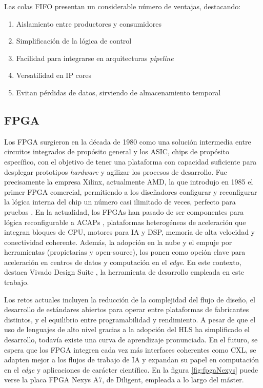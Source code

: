 Las colas FIFO presentan un considerable número de ventajas, destacando:

\begin{enumerate}
    \item Aislamiento entre productores y consumidores
    \item Simplificación de la lógica de control
    \item Facilidad para integrarse en arquitecturas \textit{pipeline}
    \item Versatilidad en IP cores
    \item Evitan pérdidas de datos, sirviendo de almacenamiento temporal
\end{enumerate}

\subsection{FPGA}

Los \ac{FPGA} surgieron en la década de 1980 como una solución intermedia entre circuitos integrados de propósito general y los \ac{ASIC}, chips de propósito específico, con el objetivo de tener una plataforma con capacidad suficiente para desplegar prototipos \textit{hardware} y agilizar los procesos de desarrollo. Fue precisamente la empresa Xilinx, actualmente AMD, la que introdujo en 1985 el primer FPGA comercial, permitiendo a los diseñadores configurar y reconfigurar la lógica interna del chip un número casi ilimitado de veces, perfecto para pruebas \cite{historiaFPGA}. En la actualidad, los FPGAs han pasado de ser componentes para lógica reconfigurable a \ac{ACAP}s \cite{amdACAP}, plataformas heterogéneas de aceleración que integran bloques de CPU, motores para \ac{IA} y \ac{DSP}, memoria de alta velocidad y conectividad coherente. Además, la adopción en la nube y el empuje por herramientas (propietarias y open-source), los ponen como opción clave para aceleración en centros de datos y computación en el \textit{edge}. En este contexto, destaca Vivado Design Suite \cite{vivadoInfo}, la herramienta de desarrollo empleada en este trabajo.

Los retos actuales incluyen la reducción de la complejidad del flujo de diseño, el desarrollo de estándares abiertos para operar entre plataformas de fabricantes distintos, y el equilibrio entre programabilidad y rendimiento. A pesar de que el uso de lenguajes de alto nivel gracias a la adopción del \ac{HLS} ha simplificado el desarrollo, todavía existe una curva de aprendizaje pronunciada. En el futuro, se espera que los FPGA integren cada vez más interfaces coherentes como CXL, se adapten mejor a los flujos de trabajo de IA y expandan su papel en computación en el \textit{edge} y aplicaciones de carácter científico. En la figura \ref{fig:fpgaNexys} puede verse la placa FPGA Nexys A7, de Diligent, empleada a lo largo del máster.

